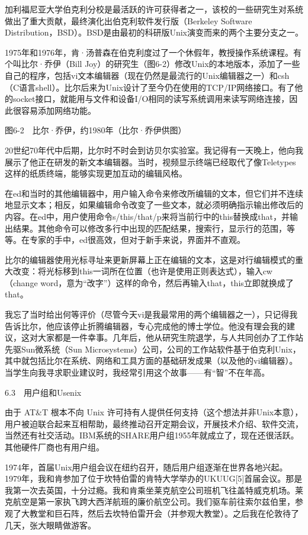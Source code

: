 \documentclass[a4paper,12pt,UTF8,twoside]{ctexbook}
\begin{document}
加利福尼亚大学伯克利分校是最活跃的许可获得者之一，该校的一些研究生对系统做出了重大贡献，最终演化出伯克利软件发行版（Berkeley Software Distribution，BSD）。BSD是由最初的科研版Unix演变而来的两个主要分支之一。

1975年和1976年，肯·汤普森在伯克利度过了一个休假年，教授操作系统课程。有个叫比尔·乔伊（Bill Joy）的研究生（图6-2）修改Unix的本地版本，添加了一些自己的程序，包括vi文本编辑器（现在仍然是最流行的Unix编辑器之一）和csh（C语言shell）。比尔后来为Unix设计了至今仍在使用的TCP/IP网络接口。有了他的socket接口，就能用与文件和设备I/O相同的读写系统调用来读写网络连接，因此很容易添加网络功能。



图6-2　比尔·乔伊，约1980年（比尔·乔伊供图）

20世纪70年代中后期，比尔时不时会到访贝尔实验室。我记得有一天晚上，他向我展示了他正在研发的新文本编辑器。当时，视频显示终端已经取代了像Teletypes这样的纸质终端，能够实现更加互动的编辑风格。

在ed和当时的其他编辑器中，用户输入命令来修改所编辑的文本，但它们并不连续地显示文本；相反，如果编辑命令改变了一些文本，就必须明确指示输出修改后的内容。在ed中，用户使用命令s/this/that/p来将当前行中的this替换成that，并输出结果。其他命令可以修改多行中出现的匹配结果，搜索行，显示行的范围，等等。在专家的手中，ed很高效，但对于新手来说，界面并不直观。

比尔的编辑器使用光标寻址来更新屏幕上正在编辑的文本，这是对行编辑模式的重大改变：将光标移到this一词所在位置（也许是使用正则表达式），输入cw（change word，意为“改字”）这样的命令，然后再输入that，this立即就换成了that。

我忘了当时给出何等评价（尽管今天vi是我最常用的两个编辑器之一），只记得我告诉比尔，他应该停止折腾编辑器，专心完成他的博士学位。他没有理会我的建议，这对大家都是一件幸事。几年后，他从研究生院退学，与人共同创办了工作站先驱Sun微系统（Sun Microsystems）公司，公司的工作站软件基于伯克利Unix，其中就包括比尔在系统、网络和工具方面的基础研发成果（以及他的vi编辑器）。当学生向我寻求职业建议时，我经常引用这个故事——有“智”不在年高。





6.3　用户组和Usenix


由于 AT\&T 根本不向 Unix 许可持有人提供任何支持（这个想法并非Unix本意），用户被迫联合起来互相帮助，最终推动召开定期会议，开展技术介绍、软件交流，当然还有社交活动。IBM系统的SHARE用户组1955年就成立了，现在还很活跃。其他硬件厂商也有用户组。

1974年，首届Unix用户组会议在纽约召开，随后用户组逐渐在世界各地兴起。1979年，我和肯参加了位于坎特伯雷的肯特大学举办的UKUUG[5]首届会议。那是我第一次去英国，十分过瘾。我和肯乘坐莱克航空公司班机飞往盖特威克机场。莱克航空是第一家执飞跨大西洋航班的廉价航空公司。我们驱车前往索尔兹伯里，参观了大教堂和巨石阵，然后去坎特伯雷开会（并参观大教堂）。之后我在伦敦待了几天，张大眼睛做游客。
\end{document}
